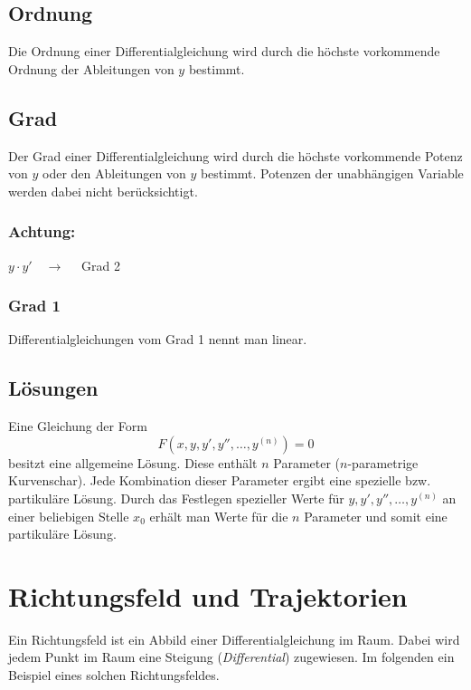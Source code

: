 \subsection{Ordnung}
Die Ordnung einer Differentialgleichung wird durch die höchste vorkommende 
Ordnung der Ableitungen von $y$ bestimmt. 

\subsection{Grad}
Der Grad einer Differentialgleichung wird durch die höchste vorkommende Potenz 
von $y$ oder den Ableitungen von $y$ bestimmt. Potenzen der unabhängigen 
Variable werden dabei nicht berücksichtigt. 
\subsubsection*{Achtung:}
$y \cdot y' \quad \rightarrow \quad$ Grad 2

\subsubsection{Grad 1}
Differentialgleichungen vom Grad 1 nennt man linear. 

\subsection{Lösungen}
Eine Gleichung der Form
\[ F(x, y, y', y'', \ldots, y^{(n)})=0 \]
besitzt eine allgemeine Lösung. Diese enthält $n$ Parameter ($n$-parametrige 
Kurvenschar). Jede Kombination dieser Parameter ergibt eine spezielle bzw. 
partikuläre Lösung. Durch das Festlegen spezieller Werte für 
$y, y', y'', \ldots, y^{(n)}$ an einer beliebigen Stelle $x_0$ erhält man Werte 
für die $n$ Parameter und somit eine partikuläre Lösung. 

\section{Richtungsfeld und Trajektorien}
Ein Richtungsfeld ist ein Abbild einer Differentialgleichung im Raum.
Dabei wird jedem Punkt im Raum eine Steigung (\emph{Differential})
zugewiesen. Im folgenden ein Beispiel eines solchen Richtungsfeldes.

